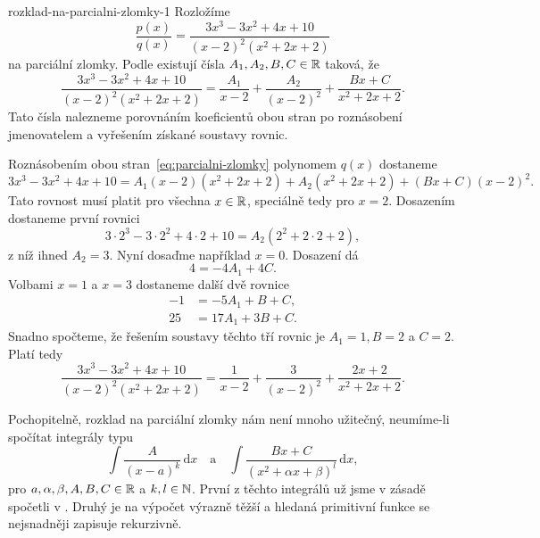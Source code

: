 \begin{example}{}{rozklad-na-parcialni-zlomky-1}
 Rozložíme
 \[
  \frac{p(x)}{q(x)} = \frac{3x^3 - 3x^2 + 4x + 10}{(x - 2)^{2}(x^2 + 2x + 2)}
 \]
 na parciální zlomky. Podle 
 existují čísla $A_1,A_2,B,C \in \mathbb{R}$ taková, že
 \begin{equation*}
  \label{eq:parcialni-zlomky}
  \tag{$\heartsuit$}
  \frac{3x^3 - 3x^2 + 4x + 10}{(x-2)^2(x^2 + 2x + 2)} = \frac{A_1}{x - 2} + \frac{A_2}{(x-2)^2}
  + \frac{Bx + C}{x^2 + 2x + 2}.
 \end{equation*}
 Tato čísla nalezneme porovnáním koeficientů obou stran po roznásobení
 jmenovatelem a vyřešením získané soustavy rovnic.

 Roznásobením obou stran~\eqref{eq:parcialni-zlomky} polynomem $q(x)$ dostaneme
 \[
  3x^3 - 3x^2 + 4x + 10 = A_1(x-2)(x^2 + 2x + 2) + A_2(x^2 + 2x + 2) + (Bx +
  C)(x-2)^2.
 \]
 Tato rovnost musí platit pro všechna $x \in \mathbb{R}$, speciálně tedy pro $x = 2$.
 Dosazením dostaneme první rovnici
 \[
  3 \cdot 2^3 - 3 \cdot 2^2 + 4 \cdot 2 + 10 = A_2(2^2 + 2 \cdot 2 + 2),
 \]
 z níž ihned $A_2 = 3$. Nyní dosaďme například $x = 0$. Dosazení dá
 \[
  4 = -4A_1 + 4C.
 \]
 Volbami $x = 1$ a $x = 3$ dostaneme další dvě rovnice
 \begin{align*}
  -1 &= -5A_1 + B + C,\\
  25 &= 17A_1 + 3B + C.
 \end{align*}
 Snadno spočteme, že řešením soustavy těchto tří rovnic je $A_1 = 1, B = 2$ a $C
 = 2$. Platí tedy
 \[
  \frac{3x^3 - 3x^2 + 4x + 10}{(x-2)^2(x^2 + 2x + 2)} = \frac{1}{x - 2} +
  \frac{3}{(x-2)^2} + \frac{2x + 2}{x^2 + 2x + 2}.
 \]
\end{example}

Pochopitelně, rozklad na parciální zlomky nám není mnoho užitečný, neumíme-li
spočítat integrály typu
\[
 \int \frac{A}{(x - a)^{k}} \, \mathrm{d}x \quad \text{a} \quad \int \frac{Bx +
 C}{(x^2 +\alpha x + \beta)^{l}} \, \mathrm{d}x, 
\]
pro $a,\alpha,\beta,A,B,C \in \mathbb{R}$ a $k,l \in \mathbb{N}$. První z těchto integrálů už
jsme v zásadě spočetli v . Druhý je na
výpočet výrazně těžší a hledaná primitivní funkce se nejsnadněji zapisuje
rekurzivně.

